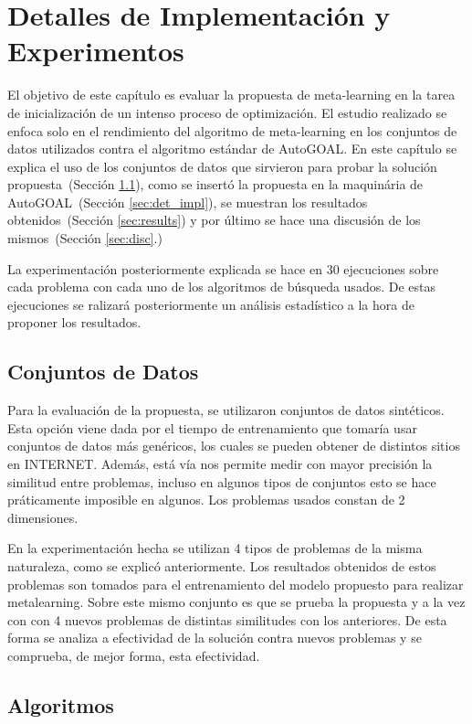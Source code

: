 \chapter{Detalles de Implementación y Experimentos}\label{chapter:implementation}

El objetivo de este capítulo es evaluar la propuesta de meta-learning en la
tarea de inicialización de un intenso proceso de optimización. El estudio
realizado se enfoca solo en el rendimiento del algoritmo de meta-learning en
los conjuntos de datos utilizados contra el algoritmo estándar de AutoGOAL.
En este capítulo se explica el uso de los conjuntos de datos que sirvieron
para probar la solución propuesta~(Sección \ref{sec:datasets}), como se
insertó la propuesta en la maquinária de AutoGOAL~(Sección \ref{sec:det_impl}),
se muestran los resultados obtenidos~(Sección \ref{sec:results}) y por último
se hace una discusión de los mismos~(Sección \ref{sec:disc}.)

La experimentación posteriormente explicada se hace en 30 ejecuciones sobre
cada problema con cada uno de los algoritmos de búsqueda usados. De estas
ejecuciones se ralizará posteriormente un análisis estadístico a la hora de
proponer los resultados.

\section{Conjuntos de Datos}\label{sec:datasets}

Para la evaluación de la propuesta, se utilizaron conjuntos de datos
sintéticos. Esta opción viene dada por el tiempo de entrenamiento que tomaría
usar conjuntos de datos más genéricos, los cuales se pueden obtener de
distintos sitios en INTERNET. Además, está vía nos permite medir con mayor
precisión la similitud entre problemas, incluso en algunos tipos de conjuntos
esto se hace práticamente imposible en algunos. Los problemas usados constan
de 2 dimensiones.

En la experimentación hecha se utilizan 4 tipos de problemas de la misma
naturaleza, como se explicó anteriormente. Los resultados obtenidos de estos
problemas son tomados para el entrenamiento del modelo propuesto para realizar
metalearning. Sobre este mismo conjunto es que se prueba la propuesta y a la
vez con con 4 nuevos problemas de distintas similitudes con los anteriores.
De esta forma se analiza a efectividad de la solución contra nuevos problemas
y se comprueba, de mejor forma, esta efectividad.

\section{Algoritmos}

